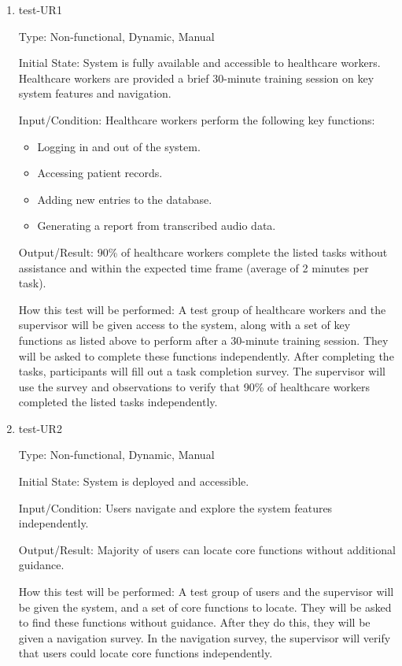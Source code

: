 \documentclass[12pt, titlepage]{article}
\begin{document}
\begin{enumerate}
  \item{test-UR1} \label{test-UR1}
  
  Type: Non-functional, Dynamic, Manual
  
  Initial State: System is fully available and accessible to healthcare workers. Healthcare workers are provided a brief 30-minute training session on key system features and navigation.

  Input/Condition: Healthcare workers perform the following key functions:
  \begin{itemize}
      \item Logging in and out of the system.
      \item Accessing patient records.
      \item Adding new entries to the database.
      \item Generating a report from transcribed audio data.
  \end{itemize}

  Output/Result: 90\% of healthcare workers complete the listed tasks without assistance and within the expected time frame (average of 2 minutes per task).

  How this test will be performed: A test group of healthcare workers and the supervisor will be given access to the system, along with a set of key functions as listed above to perform after a 30-minute training session. They will be asked to complete these functions independently. After completing the tasks, participants will fill out a task completion survey. The supervisor will use the survey and observations to verify that 90\% of healthcare workers completed the listed tasks independently.
  
    \item{test-UR2} \label{test-UR2}
    
    Type: Non-functional, Dynamic, Manual
    
    Initial State: System is deployed and accessible.
    
    Input/Condition: Users navigate and explore the system features independently.
    
    Output/Result: Majority of users can locate core functions without additional guidance.
    
    How this test will be performed: A test group of users and the supervisor will be given the system, and a set of core functions to locate. They will be asked to find these functions without guidance. After they do this, they will be given a navigation survey. In the navigation survey, the supervisor will verify that users could locate core functions independently.
\end{enumerate}
\end{document}
